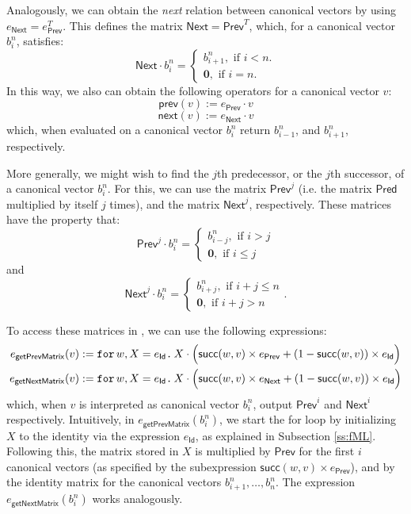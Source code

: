  
Analogously, we can obtain the \textit{next} relation between canonical vectors by using $e_{\mathsf{Next}} = e_{\mathsf{Prev}}^T$. This defines the matrix $\mathsf{Next}= \mathsf{Prev}^T$, which, for a canonical vector $b_i^n$, satisfies:
\[
{\mathsf{Next}}\cdot b_i^n=\begin{cases}
               b_{i+1}^n, \text{ if } i < n. \\
              \mathbf{0}, \text{ if } i = n.
            \end{cases}
\]
In this way, we also can obtain the following operators for a canonical vector $v$: 
$$\mathsf{prev}(v):=e_{\mathsf{Prev}}\cdot v$$
$$\mathsf{next}(v):=e_{\mathsf{Next}}\cdot v$$
which, when evaluated on a canonical vector $b_i^n$ return $b_{i-1}^n$, and $b_{i+1}^n$, respectively. 

More generally, we might wish to find the $j$th predecessor, or the $j$th successor, of a canonical vector $b_i^n$. For this, we can use the matrix $\mathsf{Prev}^j$ (i.e. the matrix $\mathsf{Pred}$ multiplied by itself $j$ times), and the matrix $\mathsf{Next}^j$, respectively. These matrices have the property that:
\[
\mathsf{Prev}^j\cdot b_i^n=\begin{cases}
               b_{i-j}^n, \text{ if } i > j \\
              \mathbf{0}, \text{ if } i \leq j
            \end{cases}
\]
and
\[
\mathsf{Next}^j\cdot b_i^n=\begin{cases}
               b_{i+j}^n, \text{ if } i + j \leq n \\
              \mathbf{0}, \text{ if } i + j > n
            \end{cases}.
\]
  
To access these matrices in \langfor, we can use the following expressions: 
\begin{align*}
       e_{\mathsf{getPrevMatrix}}(v)&:=\texttt{for}\, w,X = e_\mathsf{Id} \texttt{.}\,  X \cdot \Big( \mathsf{succ}(w,v)\times e_{\mathsf{Prev}} + (1 - \mathsf{succ}(w,v))\times e_{\mathsf{Id}} \Big)\\
e_{\mathsf{getNextMatrix}}(v)&:=\texttt{for}\, w,X = e_\mathsf{Id} \texttt{.}\,  X \cdot \Big( \mathsf{succ}(w,v)\times e_{\mathsf{Next}} + (1 - \mathsf{succ}(w,v))\times e_{\mathsf{Id}} \Big)
\end{align*}
which, when $v$ is interpreted as canonical vector $b_i^n$, output $\mathsf{Prev}^i$ and $\mathsf{Next}^i$ respectively. Intuitively, in $e_{\mathsf{getPrevMatrix}}(b_i^n)$, we start the for loop by initializing $X$ to the identity via the expression $e_{\mathsf{Id}}$, as explained in Subsection \ref{ss:fML}. Following this, the matrix stored in $X$ is multiplied by $\mathsf{Prev}$ for the first $i$ canonical vectors (as specified by the subexpression $\mathsf{succ}(w,v)\times e_{\mathsf{Prev}}$), and by the identity matrix for the canonical vectors $b_{i+1}^n, \ldots , b_n^n$. The expression $e_{\mathsf{getNextMatrix}}(b_i^n)$ works analogously.

